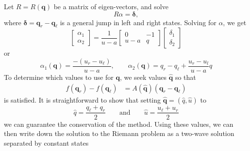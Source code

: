 \documentclass{article}
\begin{document}
Let $R = R(\mathbf q)$ be a matrix of eigen-vectors, and solve
\begin{equation}
R \alpha = \mathbf \delta,
\end{equation}
where  $\mathbf \delta = \mathbf q_r - \mathbf q_\ell$ is a general jump in
left and right states.  Solving for $\alpha$, we get 
\begin{equation}
\left[\begin{array}{c} \alpha_1 \\ \alpha_2 \end{array}\right] = \frac{1}{u-a}
\left[
\begin{array}{rr}
0 & -1 \\ u-a & q
\end{array}
\right]
\left[
\begin{array}{r}
\delta_1 \\ \delta_2
\end{array}
\right]
\end{equation}
or 
\begin{equation}
\alpha_1(\mathbf q) = \frac{-(u_r - u_\ell)}{u-a}, \qquad 
\alpha_2(\mathbf q) = q_r - q_\ell + \frac{u_r - u_l}{u-a} q
\end{equation}
To determine which values to use for $\mathbf q$, we seek values $\widehat{\mathbf q}$ 
so that 
\begin{align}
f(\mathbf q_r) - f(\mathbf q_\ell) & = A(\widehat{\mathbf q})(\mathbf q_r - \mathbf q_\ell) 
\end{align}
is satisfied.  It is straightforward to show that 
setting $\widehat{\mathbf q} = (\widehat{q},\widehat{u})$ to
\begin{equation}
\widehat{q} = \frac{q_\ell + q_r}{2} 
\qquad \mbox{and} \qquad
\widehat{u} = \frac{u_\ell + u_r}{2}
\end{equation}
we can guarantee the conservation of the method.
Using these values, we can then write
down the solution to the Riemann problem as a two-wave
solution separated by constant states
\end{document}
